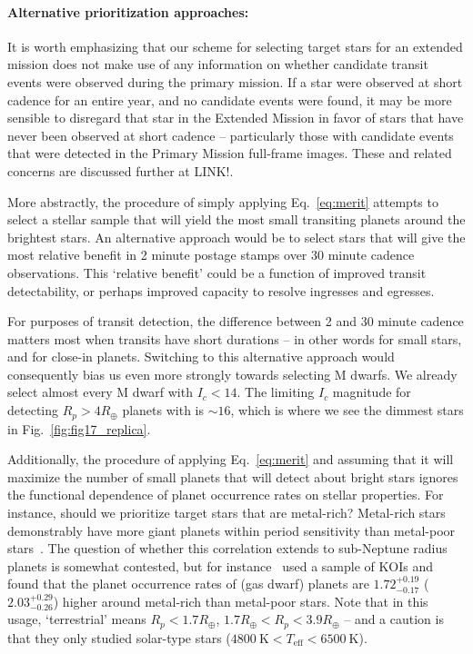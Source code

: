 \paragraph{Alternative prioritization approaches:}

It is worth emphasizing that our scheme for selecting target stars for
an extended mission does not make use of any information on whether
candidate transit events were observed during the primary mission.  If
a star were observed at short cadence for an entire year, and no
candidate events were found, it may be more sensible to disregard that
star in the Extended Mission in favor of stars that have never been
observed at short cadence -- particularly those with candidate events
that were detected in the Primary Mission full-frame images.  These
and related concerns are discussed further at LINK!.

More abstractly, the procedure of simply applying Eq.~\ref{eq:merit}
attempts to select a stellar sample that will yield the most small
transiting planets around the brightest stars.  An alternative
approach would be to select stars that will give the most relative
benefit in 2 minute postage stamps over 30 minute cadence
observations.  This `relative benefit' could be a function of improved
transit detectability, or perhaps improved capacity to resolve
ingresses and egresses.

For purposes of transit detection, the difference between 2 and 30
minute cadence matters most when transits have short durations -- in
other words for small stars, and for close-in planets.  Switching to
this alternative approach would consequently bias us even more
strongly towards selecting M dwarfs.  We already select almost every M
dwarf with $I_c < 14$.  The limiting $I_c$ magnitude for detecting
$R_p > 4R_\oplus$ planets with \tess is $\sim 16$, which is where we
see the dimmest stars in Fig.~\ref{fig:fig17_replica}.

Additionally, the procedure of applying Eq.~\ref{eq:merit} and
assuming that it will maximize the number of small planets that \tess
will detect about bright stars ignores the functional dependence of
planet occurrence rates on stellar properties.  For instance, should
we prioritize target stars that are metal-rich?  Metal-rich stars
demonstrably have more giant planets within \tesss period sensitivity
than metal-poor
stars~\citep{fischer_planet-metallicity_2005,johnson_giant_2010}.  The
question of whether this correlation extends to sub-Neptune radius
planets is somewhat contested, but for
instance~\citet{wang_revealing_2015} used a sample of KOIs and found
that the planet occurrence rates of (gas dwarf) planets are
$1.72^{+0.19}_{-0.17}$ ($2.03^{+0.29}_{-0.26}$) higher around
metal-rich than metal-poor stars.  Note that in this usage,
`terrestrial' means $R_p<1.7R_\oplus$, $1.7R_\oplus < R_p <
3.9R_\oplus$ -- and a caution is that they only studied solar-type
stars ($4800\ \mathrm{K}<T_\mathrm{eff}<6500\ \mathrm{K}$).

